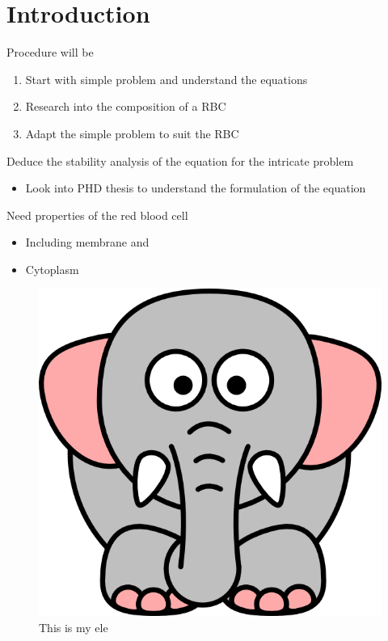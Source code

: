 \section{Introduction}


\noindent  
Procedure will be
\begin{enumerate}
	\item Start with simple problem and understand the equations
	\item	Research into the composition of a RBC
	\item	Adapt the simple problem to suit the RBC
\end{enumerate}

\noindent Deduce the stability analysis of the equation for the intricate problem 
\begin{itemize}
	\item Look into PHD thesis to understand the formulation of the equation
\end{itemize}

\noindent Need properties of the red blood cell
\begin{itemize}
	\item Including membrane and
	\item Cytoplasm
\end{itemize}





\begin{figure}[H]
	\centering

		\includegraphics[width=0.5\linewidth]{fig/ele}

	\caption{This is my ele  }
	\label{fig.ele}
\end{figure}


